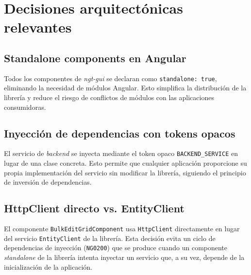 \section{Decisiones arquitectónicas relevantes}
\label{sec:decisiones}

\subsection{Standalone components en Angular}
\label{subsec:standalone}

Todos los componentes de \textit{ngt-gui} se declaran como \texttt{standalone: true},
eliminando la necesidad de módulos Angular. Esto simplifica la distribución de la librería
y reduce el riesgo de conflictos de módulos con las aplicaciones consumidoras.

\subsection{Inyección de dependencias con tokens opacos}
\label{subsec:di-tokens}

El servicio de \textit{backend} se inyecta mediante el token opaco \texttt{BACKEND\_SERVICE}
en lugar de una clase concreta. Esto permite que cualquier aplicación proporcione su propia
implementación del servicio sin modificar la librería, siguiendo el principio de inversión
de dependencias.

\subsection{HttpClient directo vs. EntityClient}
\label{subsec:httpclient}

El componente \texttt{BulkEditGridComponent} usa \texttt{HttpClient} directamente en lugar
del servicio \texttt{EntityClient} de la librería. Esta decisión evita un ciclo de
dependencias de inyección (\texttt{NG0200}) que se produce cuando un componente
\textit{standalone} de la librería intenta inyectar un servicio que, a su vez, depende de
la inicialización de la aplicación.
